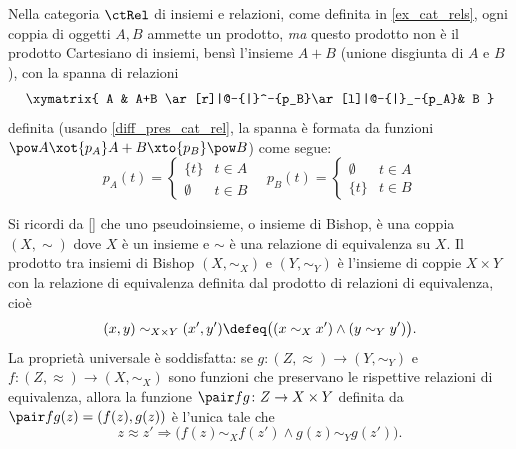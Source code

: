 \begin{example}
	Nella categoria \(\ctRel\) di insiemi e relazioni, come definita  in \ref{ex_cat_rels}, ogni coppia di oggetti \(A,B\) ammette un prodotto, \emph{ma}	questo prodotto non è il prodotto Cartesiano di insiemi, bensì l'insieme \(A + B\) (unione disgiunta di \(A\) e \(B\)), con la spanna di relazioni
	\[\xymatrix{
		A & A+B \ar[r]|@-{|}^-{p_B}\ar[l]|@-{|}_-{p_A}& B
		}\]
	definita (usando \ref{diff_pres_cat_rel}, la spanna è formata da funzioni \(\pow A \xot{p_A} A+B \xto{p_B} \pow B\)) come segue:
	\[p_A(t)=\begin{cases}
			\{t\}     & t\in A \\
			\emptyset & t\in B
		\end{cases}\quad
		p_B(t)=\begin{cases}
			\emptyset & t\in A \\
			\{t\}     & t\in B
		\end{cases}\]
\end{example}
\begin{example}
	Si ricordi da \ref{} che uno pseudoinsieme, o insieme di Bishop, è una coppia \((X,\sim)\) dove \(X\) è un insieme	e \(\sim\) è una relazione di equivalenza su \(X\). Il prodotto tra insiemi di Bishop	\((X,\sim_X)\) e \((Y,\sim_Y)\) è l'insieme di coppie \(X\times Y\) con la relazione di equivalenza definita dal prodotto	di relazioni di equivalenza, cioè
	\[(x,y)\sim_{X\times Y} (x',y') \defeq \bigl((x\sim_X x') \land (y\sim_Y y')\bigr).\]
	La proprietà universale è soddisfatta: se \(g \colon (Z,\approx)\to (Y,\sim_Y)\) e \(f \colon (Z,\approx)\to (X,\sim_X)\) sono funzioni che preservano le rispettive relazioni di equivalenza, allora la funzione \(\pair fg \colon Z\to X\times Y\) definita da \(\pair fg(z) = (f(z),g(z))\) è l'unica tale che
	\[z\approx z' \Rightarrow \bigl(f(z)\sim_X f(z') \land g(z)\sim_Y g(z')\bigr).\]
\end{example}

